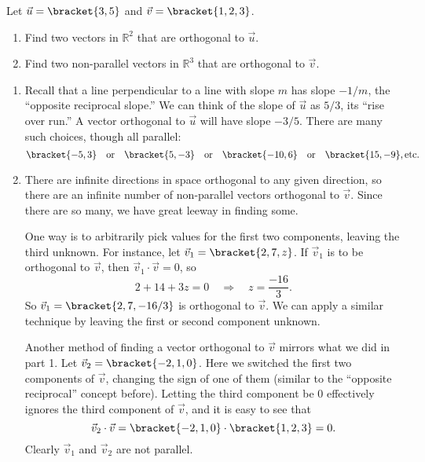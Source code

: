 \begin{example}\label{ex_dotp8}%
Let $\vec u = \bracket{3,5}$ and $\vec v = \bracket{1,2,3}$. 
\begin{enumerate}
	\item Find two vectors in $\mathbb{R}^2$ that are orthogonal to $\vec u$.
	\item	Find two non-parallel vectors in $\mathbb{R}^3$ that are orthogonal to $\vec v$.
\end{enumerate}
\solution
\begin{enumerate}
	\item Recall that a line perpendicular to a line with slope $m$ has slope $-1/m$, the ``opposite reciprocal slope.'' We can think of the slope of $\vec u$ as $5/3$, its ``rise over run.'' A vector orthogonal to $\vec u$ will have slope $-3/5$. There are many such choices, though all parallel:
	\[\bracket{-5,3}\quad \text{or} \quad\bracket{5,-3}\quad \text{or} \quad \bracket{-10,6}\quad \text{or} \quad \bracket{15,-9},\text{etc.}\]
	\item		There are infinite directions in space orthogonal to any given direction, so there are an infinite number of non-parallel vectors orthogonal to $\vec v$. Since there are so many, we have great leeway in finding some.
	
	One way is to arbitrarily pick values for the first two components, leaving the third unknown. For instance, let $\vec v_1 = \bracket{2,7,z}$. If $\vec v_1$ is to be orthogonal to $\vec v$, then $\vec v_1\cdot\vec v = 0$, so 
	\[2+14+3z=0 \quad \Rightarrow \quad z = \frac{-16}{3}.\]
	So $\vec v_1 = \bracket{2, 7, -16/3}$ is orthogonal to $\vec v$. We can apply a similar technique by leaving the first or second component unknown.
	
	Another method of finding a vector orthogonal to $\vec v$ mirrors what we did in part 1. Let $\vec v_2 = \bracket{-2,1,0}$. Here we switched the first two components of $\vec v$, changing the sign of one of them (similar to the ``opposite reciprocal'' concept before). Letting the third component be 0 effectively ignores the third component of $\vec v$, and it is easy to see that 
	\[\vec v_2\cdot\vec v = \bracket{-2,1,0}\cdot\bracket{1,2,3}= 0.\]
	Clearly $\vec v_1$ and $\vec v_2$ are not parallel.
\end{enumerate}
\end{example}

